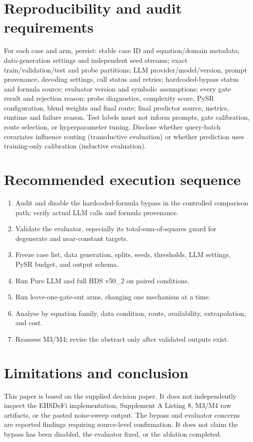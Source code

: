 \documentclass[11pt,a4paper]{article}
\begin{document}
\section{Reproducibility and audit requirements}
For each case and arm, persist: stable case ID and equation/domain metadata; data-generation settings and independent seed streams; exact train/validation/test and probe partitions; LLM provider/model/version, prompt provenance, decoding settings, call status and retries; hardcoded-bypass status and formula source; evaluator version and symbolic assumptions; every gate result and rejection reason; probe diagnostics, complexity score, PySR configuration, blend weights and final route; final predictor source, metrics, runtime and failure reason. Test labels must not inform prompts, gate calibration, route selection, or hyperparameter tuning. Disclose whether query-batch covariates influence routing (transductive evaluation) or whether prediction uses training-only calibration (inductive evaluation).
\section{Recommended execution sequence}
\begin{enumerate}
\item Audit and disable the hardcoded-formula bypass in the controlled comparison path; verify actual LLM calls and formula provenance.
\item Validate the evaluator, especially its total-sum-of-squares guard for degenerate and near-constant targets.
\item Freeze case list, data generation, splits, seeds, thresholds, LLM settings, PySR budget, and output schema.
\item Run Pure LLM and full HDS v50\_2 on paired conditions.
\item Run leave-one-gate-out arms, changing one mechanism at a time.
\item Analyse by equation family, data condition, route, availability, extrapolation, and cost.
\item Reassess M3/M4; revise the abstract only after validated outputs exist.
\end{enumerate}
\section{Limitations and conclusion}
This paper is based on the supplied decision paper. It does not independently inspect the EHSDeFi implementation, Supplement A Listing 8, M3/M4 raw artifacts, or the pasted noise-sweep output. The bypass and evaluator concerns are reported findings requiring source-level confirmation. It does not claim the bypass has been disabled, the evaluator fixed, or the ablation completed.
\end{document}
